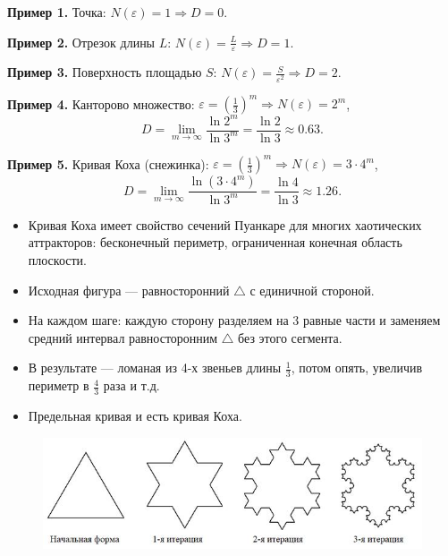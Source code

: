 	\textbf{Пример 1.} Точка: $N(\varepsilon) = 1 \Rightarrow D = 0$.
	
	\textbf{Пример 2.} Отрезок длины $L$: $N(\varepsilon) = \frac{L}{\varepsilon} \Rightarrow D = 1$.
	
	\textbf{Пример 3.} Поверхность площадью $S$: $N(\varepsilon) = \frac{S}{\varepsilon^2} \Rightarrow D = 2$.
	
	\textbf{Пример 4.} Канторово множество: $\varepsilon = \left(\frac{1}{3}\right)^m \Rightarrow N(\varepsilon) = 2^m$,
	\begin{equation}
		D = \lim_{m \to \infty} \frac{\ln 2^m}{\ln 3^m} = \frac{\ln 2}{\ln 3} \approx 0.63.
	\end{equation}
	
	\textbf{Пример 5.} Кривая Коха (снежинка): $\varepsilon = \left(\frac{1}{3}\right)^m \Rightarrow N(\varepsilon) = 3 \cdot 4^m$,
	\begin{equation}
		D = \lim_{m \to \infty} \frac{\ln (3 \cdot 4^m)}{\ln 3^m} = \frac{\ln 4}{\ln 3} \approx 1.26.
	\end{equation}
	
	\begin{itemize}
		\item Кривая Коха имеет свойство сечений Пуанкаре для многих хаотических аттракторов: бесконечный периметр, ограниченная конечная область плоскости.
		
		\item Исходная фигура — равносторонний $\triangle$ с единичной стороной.
		
		\item На каждом шаге: каждую сторону разделяем на 3 равные части и заменяем средний интервал равносторонним $\triangle$ без этого сегмента.
		
		\item В результате — ломаная из 4-х звеньев длины $\frac{1}{3}$, потом опять, увеличив периметр в $\frac{4}{3}$ раза и т.д.
		
		\item Предельная кривая и есть кривая Коха.
	\end{itemize}
	
	\vspace{-2em}
	\begin{figure}[H]
		\centering
		\includegraphics[width=1\linewidth, height=0.15\textheight]{img/17_01}
		\label{fig:17_01}
	\end{figure}
	\vspace{-3em}
	
